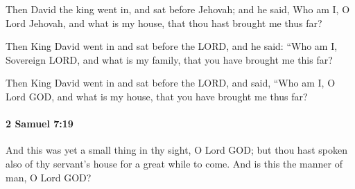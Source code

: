			\begin{versebox}
					\item[BHS] 
					\item[ASV] Then David the king went in, and sat before Jehovah; and he said, Who am I, O Lord Jehovah, and what is my house, that thou hast brought me thus far?
					\item[NIV] Then King David went in and sat before the LORD, and he said: “Who am I, Sovereign LORD, and what is my family, that you have brought me this far?
					\item[NRSV] Then King David went in and sat before the LORD, and said, “Who am I, O Lord GOD, and what is my house, that you have brought me thus far?
			\end{versebox}

		\paragraph{2 Samuel 7:19} %
			\label{2SAMUEL-7-19}

			And this was yet a small thing in thy sight, O Lord GOD; but thou hast spoken also of thy servant’s house for a great while to come. And is this the manner of man, O Lord GOD?

